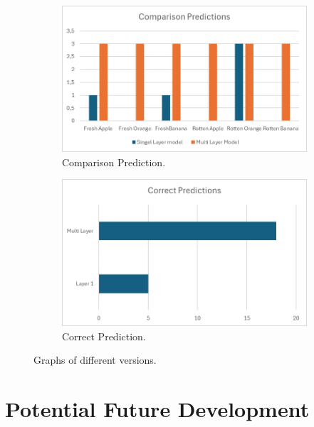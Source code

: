 \documentclass[conference]{IEEEtran}
\begin{document}
\begin{figure}[h]
    \centering
    \begin{subfigure}[b]{0.48\linewidth}
        \centering
        \includegraphics[width=\linewidth]{Graft1.png}
        \caption{Comparison Prediction.}
        \label{figFA}
    \end{subfigure}
    \hfill
    \begin{subfigure}[b]{0.48\linewidth}
        \centering
        \includegraphics[width=\linewidth]{Graft2.png}
        \caption{Correct Prediction.}
        \label{figFB}
    \end{subfigure}
    \caption{Graphs of different versions.}
    \label{FigLimDataV}
\end{figure}

\section{Potential Future Development}
\end{document}
